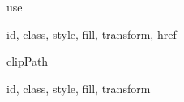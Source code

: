 \documentclass{article}
\begin{document}
\begin{Element}{use}
    \begin{Required}
    \end{Required}
    \begin{Optional}
        id, class, style, fill, transform, href
    \end{Optional}
\end{Element}

\begin{Element}{clipPath}
    \begin{Optional}
        id, class, style, fill, transform
    \end{Optional}
\end{Element}
\end{document}
